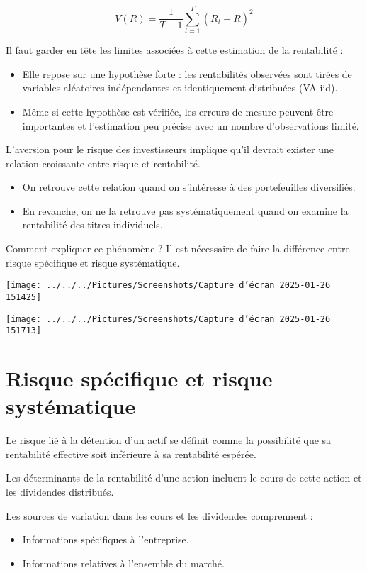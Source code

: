 \documentclass[a4paper, 12pt]{report}
\begin{document}
\[
V(R) = \frac{1}{T-1} \sum_{t=1}^{T} (R_t - \bar{R})^2 
\]

Il faut garder en tête les limites associées à cette estimation de la rentabilité :

\begin{itemize}
	\item Elle repose sur une hypothèse forte : les rentabilités observées sont tirées de variables aléatoires indépendantes et identiquement distribuées (VA iid).
	\item Même si cette hypothèse est vérifiée, les erreurs de mesure peuvent être importantes et l'estimation peu précise avec un nombre d'observations limité.
\end{itemize}

L'aversion pour le risque des investisseurs implique qu'il devrait exister une relation croissante entre risque et rentabilité. 

\begin{itemize}
	\item On retrouve cette relation quand on s'intéresse à des portefeuilles diversifiés.
	\item En revanche, on ne la retrouve pas systématiquement quand on examine la rentabilité des titres individuels.
\end{itemize}

Comment expliquer ce phénomène ? Il est nécessaire de faire la différence entre risque spécifique et risque systématique.

\begin{center}
	\texttt{[image: ../../../Pictures/Screenshots/Capture d'écran 2025-01-26 151425]}
	
	\texttt{[image: ../../../Pictures/Screenshots/Capture d'écran 2025-01-26 151713]}
\end{center}

\section{Risque spécifique et risque systématique}

Le risque lié à la détention d'un actif se définit comme la possibilité que sa rentabilité effective soit inférieure à sa rentabilité espérée.

Les déterminants de la rentabilité d'une action incluent le cours de cette action et les dividendes distribués.

Les sources de variation dans les cours et les dividendes comprennent :
\begin{itemize}
	\item Informations spécifiques à l'entreprise.
	\item Informations relatives à l'ensemble du marché.
\end{itemize}
\end{document}
